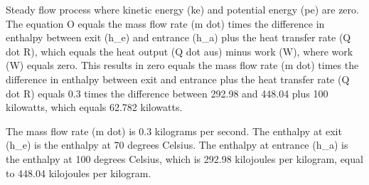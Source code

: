 Steady flow process where kinetic energy (ke) and potential energy (pe) are zero. The equation O equals the mass flow rate (m dot) times the difference in enthalpy between exit (h_e) and entrance (h_a) plus the heat transfer rate (Q dot R), which equals the heat output (Q dot aus) minus work (W), where work (W) equals zero. This results in zero equals the mass flow rate (m dot) times the difference in enthalpy between exit and entrance plus the heat transfer rate (Q dot R) equals 0.3 times the difference between 292.98 and 448.04 plus 100 kilowatts, which equals 62.782 kilowatts.

The mass flow rate (m dot) is 0.3 kilograms per second. The enthalpy at exit (h_e) is the enthalpy at 70 degrees Celsius. The enthalpy at entrance (h_a) is the enthalpy at 100 degrees Celsius, which is 292.98 kilojoules per kilogram, equal to 448.04 kilojoules per kilogram.